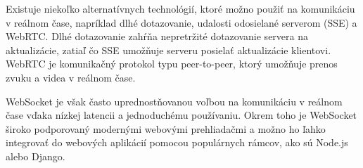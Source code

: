 Existuje niekoľko alternatívnych technológií, ktoré možno použiť na komunikáciu v reálnom čase, napríklad dlhé dotazovanie, udalosti odosielané serverom (SSE) a WebRTC. Dlhé dotazovanie zahŕňa nepretržité dotazovanie servera na aktualizácie, zatiaľ čo SSE umožňuje serveru posielať aktualizácie klientovi. WebRTC je komunikačný protokol typu peer-to-peer, ktorý umožňuje prenos zvuku a videa v reálnom čase.

WebSocket je však často uprednostňovanou voľbou na komunikáciu v reálnom čase vďaka nízkej latencii a jednoduchému používaniu. Okrem toho je WebSocket široko podporovaný modernými webovými prehliadačmi a možno ho ľahko integrovať do webových aplikácií pomocou populárnych rámcov, ako sú Node.js alebo Django.







